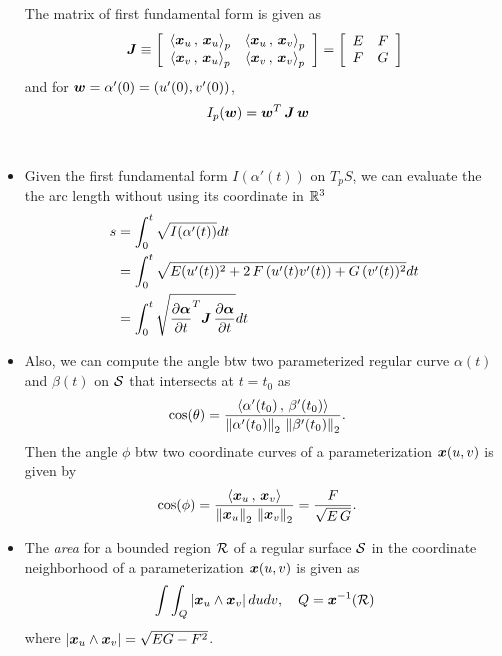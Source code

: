 \documentclass[11pt]{article}
\begin{document}
\begin{itemize}
The matrix of first fundamental form is given as 
\begin{align}
\boldsymbol{J}\equiv \left[\begin{array}{cc}
\left\langle \boldsymbol{x}_{u}\,,\, \boldsymbol{x}_{u} \right\rangle_{p} &  \left\langle \boldsymbol{x}_{u}\,,\, \boldsymbol{x}_{v} \right\rangle_{p} \\ 
 \left\langle \boldsymbol{x}_{v}\,,\, \boldsymbol{x}_{u} \right\rangle_{p} & \left\langle \boldsymbol{x}_{v}\,,\, \boldsymbol{x}_{v} \right\rangle_{p}
\end{array} \right] = 
\left[\begin{array}{cc}
E & F \\ 
F & G
\end{array} \right] \label{eqn: first_fund_form3}
\end{align}
and for $\boldsymbol{w} = \alpha'(0) = (u'(0), v'(0))$, 
\begin{align*}
I_{p}(\boldsymbol{w}) &= \boldsymbol{w}^{T}\,\boldsymbol{J}\,\boldsymbol{w}
\end{align*}\\

\item Given the first fundamental form $I(\alpha'(t))$ on $T_{p}S$, we can evaluate the the arc length without using its coordinate in ${\mathbb R}^{3}$ 
\begin{align}
s &= \int_{0}^{t} \sqrt{I(\alpha'(t))}  dt\nonumber\\
&= \int_{0}^{t} \sqrt{E(u'(t))^{2}+ 2\,F\,(u'(t)v'(t)) + G\,(v'(t))^{2}  }  dt \nonumber\\
&=  \int_{0}^{t} \sqrt{ \dfrac{\partial \boldsymbol{\alpha}}{ \partial t}^{T}\boldsymbol{J}\, \dfrac{\partial \boldsymbol{\alpha}}{ \partial t} }  dt  \label{eqn: arc_leng_2}
\end{align}

\item Also, we can compute the angle btw two parameterized regular curve $\alpha(t)$ and $\beta(t)$ on ${\mathcal S}$ that intersects at $t=t_{0}$ as 
\begin{align*}
\cos(\theta) &= \frac{\left\langle \alpha'(t_{0})\,,\, \beta'(t_{0}) \right\rangle}{\left\|\alpha'(t_{0})\right\|_{2}\,\left\|\beta'(t_{0})\right\|_{2}}.
\end{align*}
Then the angle $\phi$ btw two coordinate curves of a parameterization $\boldsymbol{x}(u,v)$ is given by 
\begin{align*}
\cos(\phi) &= \frac{\left\langle \boldsymbol{x}_{u}\,,\, \boldsymbol{x}_{v} \right\rangle}{\left\|\boldsymbol{x}_{u}\right\|_{2}\,\left\|\boldsymbol{x}_{v}\right\|_{2}} = \frac{F}{\sqrt{E\,G}}.
\end{align*}

\item The \emph{area} for a bounded region ${\mathcal R}$ of a regular surface ${\mathcal S}$ in the coordinate neighborhood of a parameterization $\boldsymbol{x}(u,v)$ is given as 
\begin{align}
\int\int_{Q} \left\lvert \boldsymbol{x}_{u}\wedge \boldsymbol{x}_{v} \right\rvert dudv, \quad Q = \boldsymbol{x}^{-1}({\mathcal R}) \label{eqn: area_first_fund}
\end{align} 
where $\left\lvert \boldsymbol{x}_{u}\wedge \boldsymbol{x}_{v} \right\rvert = \sqrt{EG - F^{2}}$.
\end{itemize}
\end{document}
